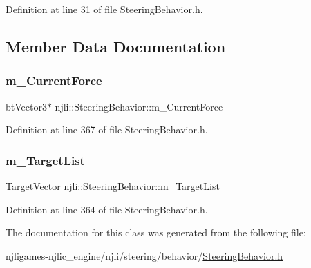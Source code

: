 Definition at line 31 of file Steering\+Behavior.\+h.



\subsection{Member Data Documentation}
\mbox{\label{classnjli_1_1_steering_behavior_a9148bc145f9bc1943d6c40fe263fcb29}} 
\subsubsection{\texorpdfstring{m\+\_\+\+Current\+Force}{m\_CurrentForce}}
{\footnotesize\ttfamily bt\+Vector3$\ast$ njli\+::\+Steering\+Behavior\+::m\+\_\+\+Current\+Force\hspace{0.3cm}{\ttfamily [private]}}



Definition at line 367 of file Steering\+Behavior.\+h.

\mbox{\label{classnjli_1_1_steering_behavior_a48a4deef579ab968bdd4ecf0ba0c8668}} 
\subsubsection{\texorpdfstring{m\+\_\+\+Target\+List}{m\_TargetList}}
{\footnotesize\ttfamily \mbox{\hyperlink{classnjli_1_1_steering_behavior_ab7a7224d97d2e392e5ae75108a6c160a}{Target\+Vector}} njli\+::\+Steering\+Behavior\+::m\+\_\+\+Target\+List\hspace{0.3cm}{\ttfamily [protected]}}



Definition at line 364 of file Steering\+Behavior.\+h.



The documentation for this class was generated from the following file\+:\begin{DoxyCompactItemize}
\item 
njligames-\/njlic\+\_\+engine/njli/steering/behavior/\mbox{\hyperlink{_steering_behavior_8h}{Steering\+Behavior.\+h}}\end{DoxyCompactItemize}

